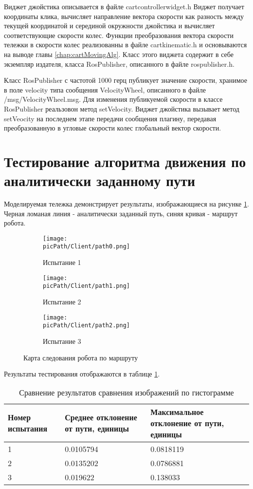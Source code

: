 \documentclass[oneside,final,14pt]{extreport}
\newcommand{\picPath}{img}
\begin{document}
Виджет джойстика описывается в файле cartcontrollerwidget.h
Виджет получает координаты клика, вычисляет направление вектора скорости как разность между текущей координатой и серединой окружности джойстика  и вычисляет соответствующие скорости колес.  Функции преобразования вектора скорости тележки в скорости колес реализованны в файле cartkinematic.h и основываются на выводе главы \ref{chap:cartMovingAlg}. 
Класс этого виджета содержит в себе экземпляр издателя, класса RosPublisher, описанного в файле rospublisher.h.

 Класс RosPublisher с частотой 1000 герц публикует значение скорости, хранимое в поле velocity типа сообщения VelocityWheel,  описанного в файле /msg/VelocityWheel.msg. Для изменения публикуемой скорости в классе RosPublisher реальзовон метод setVelocity. Виджет джойстика вызывает метод setVeocity на последнем этапе передачи сообщения плагину, передавая преобразованную в угловые скорости колес глобальный вектор скорости.

\section{Тестирование алгоритма движения по аналитически заданному пути}

Моделируемая тележка демонстрирует результаты, изображающиеся на рисунке \ref{Figure:tests}. Черная ломаная линия - аналитически заданный путь, синяя кривая - маршрут робота. 


\begin{figure}[H]
  \centering
  \begin{subfigure}[b]{0.3\linewidth}
   \texttt{[image: \\picPath/Client/path0.png]}
    \caption{  Испытание 1}
  \end{subfigure}
  \begin{subfigure}[b]{0.3\linewidth}
    \texttt{[image: \\picPath/Client/path1.png]}
    \caption{ Испытание 2}
  \end{subfigure}
   \begin{subfigure}[b]{0.3\linewidth}
    \texttt{[image: \\picPath/Client/path2.png]}
    \caption{ Испытание 3}
  \end{subfigure}

  \caption{ Карта следования робота по маршруту }
  \label{Figure:tests}
\end{figure}

Результаты тестирования отображаются в таблице \ref{table:test}.  
\begin{table}[H] 
\caption{Сравнение результатов сравнения изображений по гистограмме}
\label{table:test}
\begin{tabularx}{\textwidth}{|X|X|X|}
\hline
Номер испытания
&
Среднее отклонение от пути, единицы
&
Максимальное отклонение от пути, единицы
\\
\hline
1
&
 0.0105794
& 
 0.0818119 
\\
\hline
2
&
 0.0135202
& 
 0.0786881 
\\
\hline
3
&
 0.019622
& 
 0.138033
\\
\hline
\end{tabularx}
\end{table}
  
\end{document}
